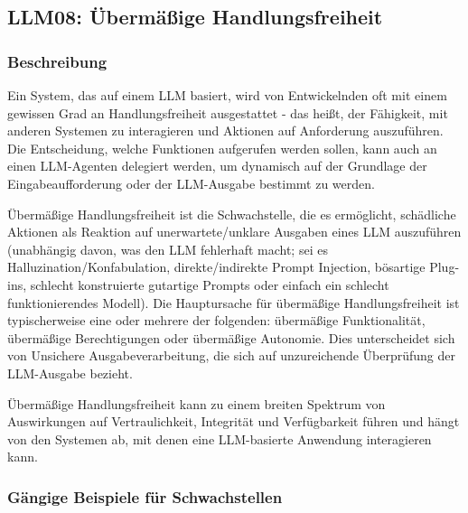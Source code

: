\documentclass[
]{article}
\author{}
\date{}
\begin{document}
\subsection{LLM08: Übermäßige
Handlungsfreiheit}\label{llm08-uxfcbermuxe4uxdfige-handlungsfreiheit}

\subsubsection{Beschreibung}\label{beschreibung}

Ein System, das auf einem LLM basiert, wird von Entwickelnden oft mit
einem gewissen Grad an Handlungsfreiheit ausgestattet - das heißt, der
Fähigkeit, mit anderen Systemen zu interagieren und Aktionen auf
Anforderung auszuführen. Die Entscheidung, welche Funktionen aufgerufen
werden sollen, kann auch an einen LLM-Agenten delegiert werden, um
dynamisch auf der Grundlage der Eingabeaufforderung oder der LLM-Ausgabe
bestimmt zu werden.

Übermäßige Handlungsfreiheit ist die Schwachstelle, die es ermöglicht,
schädliche Aktionen als Reaktion auf unerwartete/unklare Ausgaben eines
LLM auszuführen (unabhängig davon, was den LLM fehlerhaft macht; sei es
Halluzination/Konfabulation, direkte/indirekte Prompt Injection,
bösartige Plug-ins, schlecht konstruierte gutartige Prompts oder einfach
ein schlecht funktionierendes Modell). Die Hauptursache für übermäßige
Handlungsfreiheit ist typischerweise eine oder mehrere der folgenden:
übermäßige Funktionalität, übermäßige Berechtigungen oder übermäßige
Autonomie. Dies unterscheidet sich von Unsichere Ausgabeverarbeitung,
die sich auf unzureichende Überprüfung der LLM-Ausgabe bezieht.

Übermäßige Handlungsfreiheit kann zu einem breiten Spektrum von
Auswirkungen auf Vertraulichkeit, Integrität und Verfügbarkeit führen
und hängt von den Systemen ab, mit denen eine LLM-basierte Anwendung
interagieren kann.

\subsubsection{Gängige Beispiele für
Schwachstellen}\label{guxe4ngige-beispiele-fuxfcr-schwachstellen}
\end{document}

